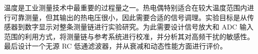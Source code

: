 温度是工业测量技术中最重要的过程量之一。热电偶特别适合在较大温度范围内进行可靠测量，但其输出的热电压很小，因此需要合适的信号调理。实验目标是从传感器到数字显示对整条测量链进行实验研究。为此需要设计信号放大和 ADC 输入范围的利用方式，将测量链与参考系统进行校准，并分析其对高频干扰的敏感性。最后设计一个无源 RC 低通滤波器，并从衰减和动态性能方面进行评价。
